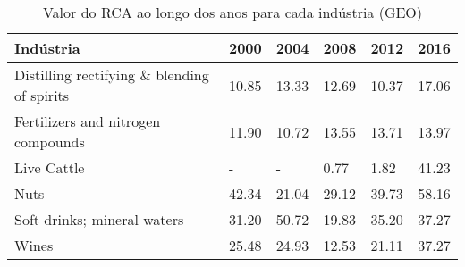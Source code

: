 \begin{table}
\centering
\caption{Valor do RCA ao longo dos anos para cada indústria (GEO)}
\label{tab:ex3-tempo-GEO}
\begin{tabular}{p{6cm}p{1.5cm}p{1.5cm}p{1.5cm}p{1.5cm}p{1.5cm}}
\toprule
                                  Indústria &  2000 &  2004 &  2008 &  2012 &  2016 \\
\midrule
Distilling rectifying \& blending of spirits & 10.85 & 13.33 & 12.69 & 10.37 & 17.06 \\
         Fertilizers and nitrogen compounds & 11.90 & 10.72 & 13.55 & 13.71 & 13.97 \\
                                Live Cattle &     - &     - &  0.77 &  1.82 & 41.23 \\
                                       Nuts & 42.34 & 21.04 & 29.12 & 39.73 & 58.16 \\
                Soft drinks; mineral waters & 31.20 & 50.72 & 19.83 & 35.20 & 37.27 \\
                                      Wines & 25.48 & 24.93 & 12.53 & 21.11 & 37.27 \\
\bottomrule
\end{tabular}
\end{table}
